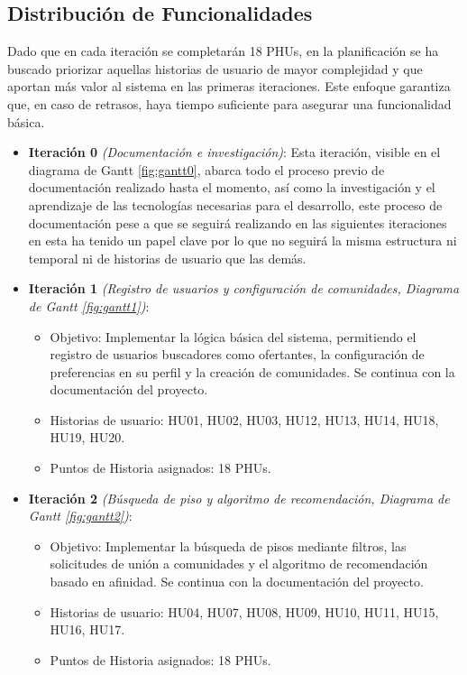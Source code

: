 \subsection{Distribución de Funcionalidades}
Dado que en cada iteración se completarán 18 PHUs, en la planificación se ha buscado priorizar aquellas historias de usuario de mayor complejidad y que aportan más valor al sistema en las primeras iteraciones. Este enfoque garantiza que, en caso de retrasos, haya tiempo suficiente para asegurar una funcionalidad básica.

\begin{itemize}
    \item \textbf{Iteración 0} \textit{(Documentación e investigación)}: Esta iteración, visible en el diagrama de Gantt  \ref{fig:gantt0}, abarca todo el proceso previo de documentación realizado hasta el momento, así como la investigación y el aprendizaje de las tecnologías necesarias para el desarrollo, este proceso de documentación pese a que se seguirá realizando en las siguientes iteraciones en esta ha tenido un papel clave por lo que no seguirá la misma estructura ni temporal ni de historias de usuario que las demás.

    \item \textbf{Iteración 1} \textit{(Registro de usuarios y configuración de comunidades, Diagrama de Gantt  \ref{fig:gantt1})}:
    \begin{itemize}
        \item Objetivo: Implementar la lógica básica del sistema, permitiendo el registro de usuarios buscadores como ofertantes, la configuración de preferencias en su perfil y la creación de comunidades. Se continua con la documentación del proyecto.
        \item Historias de usuario: HU01, HU02, HU03, HU12, HU13, HU14, HU18, HU19, HU20.
        \item Puntos de Historia asignados: 18 PHUs.
    \end{itemize}
    
    \item \textbf{Iteración 2} \textit{(Búsqueda de piso y algoritmo de recomendación, Diagrama de Gantt  \ref{fig:gantt2})}:
    \begin{itemize}
        \item Objetivo: Implementar la búsqueda de pisos mediante filtros, las solicitudes de unión a comunidades y el algoritmo de recomendación basado en afinidad. Se continua con la documentación del proyecto.
        \item Historias de usuario: HU04, HU07, HU08, HU09, HU10, HU11, HU15, HU16, HU17.
        \item Puntos de Historia asignados: 18 PHUs.
    \end{itemize}
    

\end{itemize}
